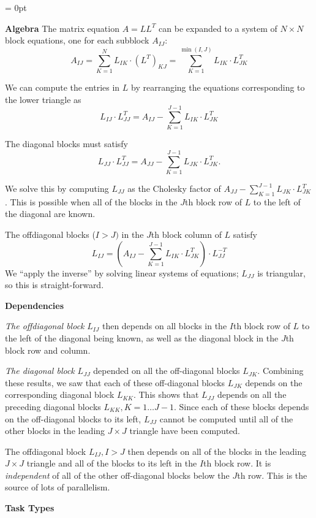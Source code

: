 \documentclass[12pt]{article}
\begin{document}
\parskip=12pt
\parindent = 0pt

{\large \bf Algebra}
The matrix equation $A = L L^T$ can be expanded to a system of $N \times N$
block equations, one for each subblock $A_{IJ}$:
\[  A_{IJ} = \sum_{K=1}^{N} L_{IK} \cdot (L^T)_{KJ}
= \sum_{K=1}^{\min (I,J)} L_{IK} \cdot L_{JK}^T \]

We can compute the entries in $L$ by rearranging the equations corresponding to
the lower triangle as
\[ L_{IJ} \cdot L_{JJ}^T = A_{IJ} -
\sum_{K=1}^{J-1} L_{IK} \cdot L_{JK}^T \]

The diagonal blocks must satisfy
\[ L_{JJ} \cdot L_{JJ}^T = A_{JJ} -
\sum_{K=1}^{J-1} L_{JK} \cdot L_{JK}^T. \]

We solve this by computing $L_{JJ}$ as the Cholesky factor of $A_{JJ} -
\sum_{K=1}^{J-1} L_{JK} \cdot L_{JK}^T$.  This is possible when all of the
blocks in the $J$th block row of $L$ to the left of the diagonal are known.

The offdiagonal blocks ($I > J)$ in the  $J$th block column of $L$ satisfy
\[ L_{IJ} = ( A_{IJ} - \sum_{K=1}^{J-1} L_{IK} \cdot L_{JK}^T)
\cdot L_{JJ}^{-T}  \]
We ``apply the inverse'' by solving linear systems of equations; $L_{JJ}$ is
triangular, so this is straight-forward.

{\large \bf Dependencies}

\emph{The offdiagonal block} $L_{IJ}$ then depends on all blocks in
the $I$th block row of $L$ to the left of the diagonal being known, as
well as the diagonal block in the $J$th block row and column.

\emph{The diagonal block} $L_{JJ}$ depended on all the off-diagonal
blocks $L_{JK}$.  Combining these results, we saw that each of these
off-diagonal blocks $L_{JK}$ depends on the corresponding diagonal
block $L_{KK}$.  This shows that $L_{JJ}$ depends on all the preceding
diagonal blocks $L_{KK}, K = 1 \ldots J-1$.  Since each of these
blocks depends on the off-diagonal blocks to its left, $L_{JJ}$ cannot
be computed until all of the other blocks in the leading $J \times J$
triangle have been computed.

The offdiagonal block $L_{IJ}, I > J$ then depends on all of the blocks in the
leading $J \times J$ triangle and all of the blocks to its left in the
$I$th block row.  It is \emph{independent} of all of the other off-diagonal
blocks below the $J$th row.  This is the source of lots of parallelism.

{\large \bf Task Types}
\end{document}
